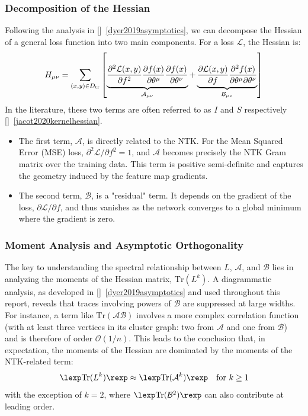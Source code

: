 \subsubsection{Decomposition of the Hessian}
Following the analysis in []~\ref{dyer2019asymptotics}, we can decompose the Hessian of a general loss function into two main components. For a loss $\mathcal{L}$, the Hessian is:
\begin{equation}
H_{\mu\nu} = \sum_{(x,y)\in D_{\rm tr}}\left[\underbrace{\frac{\partial^{2}\mathcal{L}(x,y)}{\partial f^{2}}\frac{\partial f(x)}{\partial\theta^{\mu}}\frac{\partial f(x)}{\partial\theta^{\nu}}}_{\mathcal{A}_{\mu\nu}}
+ \underbrace{\frac{\partial\mathcal{L}(x,y)}{\partial f}\frac{\partial^{2}f(x)}{\partial\theta^{\mu}\partial\theta^{\nu}}}_{\mathcal{B}_{\mu\nu}}\right]
\end{equation}
In the literature, these two terms are often referred to as $I$ and $S$ respectively []~\ref{jacot2020kernelhessian}.
\begin{itemize}
    \item The first term, $\mathcal{A}$, is directly related to the NTK. For the Mean Squared Error (MSE) loss, $\partial^2\mathcal{L}/\partial f^2 = 1$, and $\mathcal{A}$ becomes precisely the NTK Gram matrix over the training data. This term is positive semi-definite and captures the geometry induced by the feature map gradients.
    \item The second term, $\mathcal{B}$, is a "residual" term. It depends on the gradient of the loss, $\partial\mathcal{L}/\partial f$, and thus vanishes as the network converges to a global minimum where the gradient is zero.
\end{itemize}

\subsubsection{Moment Analysis and Asymptotic Orthogonality}
The key to understanding the spectral relationship between $L$, $\mathcal{A}$, and $\mathcal{B}$ lies in analyzing the moments of the Hessian matrix, $\mathrm{Tr}(L^k)$.
A diagrammatic analysis, as developed in []~\ref{dyer2019asymptotics} and used throughout this report, reveals that traces involving powers of $\mathcal{B}$ are suppressed at large widths. For instance, a term like $\mathrm{Tr}(\mathcal{A}\mathcal{B})$ involves a more complex correlation function (with at least three vertices in its cluster graph: two from $\mathcal{A}$ and one from $\mathcal{B}$) and is therefore of order $\mathcal{O}(1/n)$. This leads to the conclusion that, in expectation, the moments of the Hessian are dominated by the moments of the NTK-related term:
\begin{equation}
\lexp \mathrm{Tr}(L^k) \rexp \approx \lexp \mathrm{Tr}(\mathcal{A}^k) \rexp \quad \text{for } k \ge 1
\end{equation}
with the exception of $k=2$, where $\lexp \mathrm{Tr}(\mathcal{B}^2) \rexp$ can also contribute at leading order.

